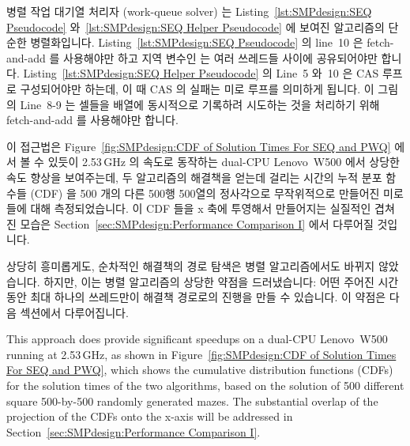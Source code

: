 병렬 작업 대기열 처리자 (work-queue solver) 는
Listing~\ref{lst:SMPdesign:SEQ Pseudocode}
와~\ref{lst:SMPdesign:SEQ Helper Pseudocode} 에 보여진 알고리즘의 단순한
병렬화입니다.
Listing~\ref{lst:SMPdesign:SEQ Pseudocode} 의 line~10 은 fetch-and-add 를
사용해야만 하고 지역 변수인  는 여러 쓰레드들 사이에 공유되어야만
합니다.
Listing~\ref{lst:SMPdesign:SEQ Helper Pseudocode} 의 Line~5 와~10 은 CAS 루프로
구성되어야만 하는데, 이 때 CAS 의 실패는 미로 루프를 의미하게 됩니다.
이 그림의 Line~8-9 는 셀들을  배열에 동시적으로 기록하려
시도하는 것을 처리하기 위해 fetch-and-add 를 사용해야만 합니다.

이 접근법은 Figure~\ref{fig:SMPdesign:CDF of Solution Times For SEQ and PWQ}
에서 볼 수 있듯이 2.53\,GHz 의 속도로 동작하는 dual-CPU
Lenovo\mytexttrademark\ W500 에서 상당한 속도 향상을 보여주는데,
두 알고리즘의 해결책을 얻는데 걸리는 시간의 누적 분포 함수들 (CDF) 을 500 개의
다른 500행 500열의 정사각으로 무작위적으로 만들어진 미로들에 대해
측정되었습니다.
이 CDF 들을 x 축에 투영해서 만들어지는 실질적인 겹쳐진 모습은
Section~\ref{sec:SMPdesign:Performance Comparison I} 에서 다루어질 것입니다.

상당히 흥미롭게도, 순차적인 해결책의 경로 탐색은 병렬 알고리즘에서도 바뀌지
않았습니다.
하지만, 이는 병렬 알고리즘의 상당한 약점을 드러냈습니다:
어떤 주어진 시간 동안 최대 하나의 쓰레드만이 해결책 경로로의 진행을 만들 수
있습니다.
이 약점은 다음 섹션에서 다루어집니다.
\iffalse

This approach does provide significant speedups on a dual-CPU
Lenovo\mytexttrademark\ W500
running at 2.53\,GHz, as shown in
Figure~\ref{fig:SMPdesign:CDF of Solution Times For SEQ and PWQ},
which shows the cumulative distribution functions (CDFs) for the solution
times of the two algorithms, based on the solution of 500 different square
500-by-500 randomly generated mazes.
The substantial overlap
of the projection of the CDFs onto the x-axis will be addressed in
Section~\ref{sec:SMPdesign:Performance Comparison I}.

